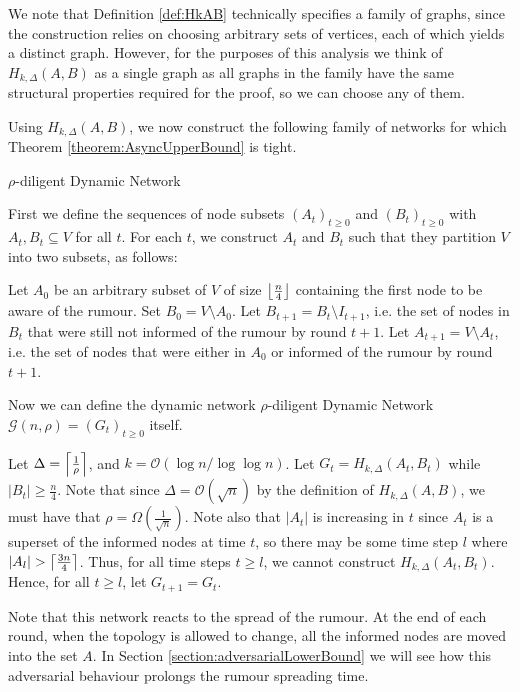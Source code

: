We note that Definition \ref{def:HkAB} technically specifies a family of graphs, since the construction relies on choosing arbitrary sets of vertices, each of which yields a distinct graph. However, for the purposes of this analysis we think of $H_{k, \Delta}(A,B)$ as a single graph as all graphs in the family have the same structural properties required for the proof, so we can choose any of them.

Using $H_{k, \Delta}(A,B)$, we now construct the following family of networks for which Theorem \ref{theorem:AsyncUpperBound} is tight.

\begin{definition}
	$\rho$-diligent Dynamic Network
	
	First we define the sequences of node subsets $(A_t)_{t \geq 0}$ and $(B_t)_{t \geq 0}$ with $A_t, B_t \subseteq V$ for all $t$. For each $t$, we construct $A_t$ and $B_t$ such that they partition $V$ into two subsets, as follows:

	Let $A_0$ be an arbitrary subset of $V$ of size $\floor*{\frac{n}{4}}$ containing the first node to be aware of the rumour. 
	Set $B_0 = V \setminus A_0$. Let $B_{t+1} = B_t \setminus I_{t+1}$, i.e. the set of nodes in $B_t$ that were still not informed of the rumour by round $t+1$.
	Let $A_{t+1} = V \setminus A_t$, i.e. the set of nodes that were either in $A_0$ or informed of the rumour by round $t+1$.

	Now we can define the dynamic network $\rho$-diligent Dynamic Network $\mathcal{G}(n, \rho) = (G_t)_{t \geq 0}$ itself. 

	Let $\Delta = \ceil*{\frac{1}{\rho}}$, and $k = \mathcal{O}(\log n / \log \log n)$.
	Let $G_t = H_{k, \Delta}(A_t, B_t)$ while $|B_t| \geq \frac{n}{4}$. Note that since $\Delta = \mathcal{O}(\sqrt{n})$ by the definition of $H_{k, \Delta}(A,B)$, we must have that $\rho = \Omega\left(\frac{1}{\sqrt{n}}\right)$.
	Note also that $|A_t|$ is increasing in $t$ since $A_t$ is a superset of the informed nodes at time $t$, so there may be some time step $l$ where $|A_l| > \ceil*{\frac{3n}{4}}$. Thus, for all time steps $t \geq l$, we cannot construct $H_{k, \Delta}(A_t,B_t)$. Hence, for all $t \geq l$, let $G_{t+1} = G_t$.
\end{definition}

Note that this network reacts to the spread of the rumour. At the end of each round, when the topology is allowed to change, all the informed nodes are moved into the set $A$. In Section \ref{section:adversarialLowerBound} we will see how this adversarial behaviour prolongs the rumour spreading time.

